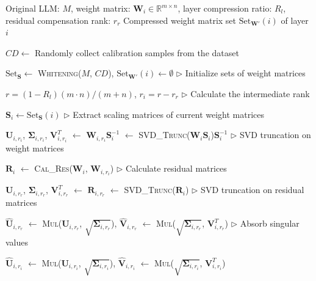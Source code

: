 \begin{algorithm}[ht]
    \caption{Pseudocode of Residual Compensation}
    \label{alg_rc}
    \renewcommand{\algorithmicrequire}{\textbf{Input:}}
    \renewcommand{\algorithmicensure}{\textbf{Output:}}
    
    \begin{algorithmic}[1]
        \REQUIRE Original LLM: $M$, weight matrix: $\boldsymbol{W}_i\in\mathbb{R}^{m\times n}$, layer compression ratio: $R_l$, residual compensation rank: $r_r$   %
        \ENSURE Compressed weight matrix set $\mathrm{Set}_{\boldsymbol{W'}}(i)$ of layer $i$     %
        
        \STATE $CD \gets$ Randomly collect calibration samples from the dataset
        

        \STATE $\mathrm{Set}_{\boldsymbol{S}} \gets$ \textsc{Whitening}($M$, $CD$), $\mathrm{Set}_{\boldsymbol{W'}}(i) \gets \emptyset$ \hfill $\triangleright$ Initialize sets of weight matrices

        \STATE $r = (1-R_l)(m \cdot n)/(m+n) $, $r_i = r-r_r$ \hfill $\triangleright$ Calculate the intermediate rank
            
        \STATE $\boldsymbol{S}_i \gets \mathrm{Set}_{\boldsymbol{S}}(i)$ \hfill $\triangleright$ Extract scaling matrices of current weight matrices

        \STATE $\boldsymbol{U}_{i,r_i}$, $\boldsymbol{\Sigma}_{i,r_i}$, $\boldsymbol{V}_{i,r_i}^T$ $\gets$ $\boldsymbol{W}_{i,r_i}\boldsymbol{S}_i^{-1}$ $\gets$ \textsc{SVD\_Trunc}($\boldsymbol{W}_i\boldsymbol{S}_i$)$\boldsymbol{S}_i^{-1}$ \hfill $\triangleright$ SVD truncation on weight matrices

        \STATE $\boldsymbol{R}_{i}$ $\gets$ \textsc{Cal\_Res}($\boldsymbol{W}_i$, $\boldsymbol{W}_{i,r_i}$) \hfill $\triangleright$ Calculate residual matrices

        \STATE $\boldsymbol{U}_{i,r_r}$, $\boldsymbol{\Sigma}_{i,r_r}$, $\boldsymbol{V}_{i,r_r}^T$ $\gets$ $\boldsymbol{R}_{i,r_r}$ $\gets$ \textsc{SVD\_Trunc}($\boldsymbol{R}_i$) \hfill $\triangleright$ SVD truncation on residual matrices

        \STATE $\hat{\boldsymbol{U}}_{i,r_r}$ $\gets$ \textsc{Mul}($\boldsymbol{U}_{i,r_r}$, $\sqrt{\boldsymbol{\Sigma}_{i,r_r}}$), $\hat{\boldsymbol{V}}_{i,r_r}$ $\gets$ \textsc{Mul}($\sqrt{\boldsymbol{\Sigma}_{i,r_r}}$, $\boldsymbol{V}_{i,r_r}^T$) \hfill $\triangleright$ Absorb singular values

        \STATE $\hat{\boldsymbol{U}}_{i,r_i}$ $\gets$ \textsc{Mul}($\boldsymbol{U}_{i,r_i}$, $\sqrt{\boldsymbol{\Sigma}_{i,r_i}}$), $\hat{\boldsymbol{V}}_{i,r_i}$ $\gets$ \textsc{Mul}($\sqrt{\boldsymbol{\Sigma}_{i,r_i}}$, $\boldsymbol{V}_{i,r_i}^T$) 
                

\end{algorithmic}
\end{algorithm}
